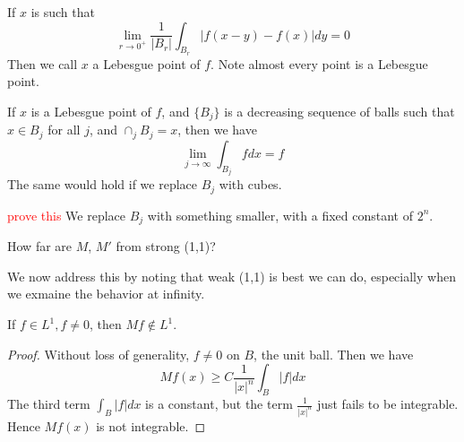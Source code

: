 \begin{definition}
    If $x$ is such that 
    \begin{equation*}
        \lim_{r\to 0^+}\frac{1}{|B_r|}\int_{B_r}|f(x-y)-f(x)|dy=0
    \end{equation*}
    Then we call $x$ a Lebesgue point of $f$. Note almost every point is a Lebesgue point.
\end{definition}
\begin{proposition}
    If $x$ is a Lebesgue point of $f$, and $\{B_j\}$ is a decreasing sequence of balls such that $x\in B_j$ for all $j$, and $\cap_jB_j=x$, then we have
    \begin{equation*}
        \lim_{j\to\infty}\int_{B_j}fdx=f
    \end{equation*}
    The same would hold if we replace $B_j$ with cubes.
\end{proposition}
\begin{remark}
    \textcolor{red}{prove this} We replace $B_j$ with something smaller, with a fixed constant of $2^n$.
\end{remark}

\begin{problem}
    How far are $M$, $M'$ from strong (1,1)?
\end{problem}
We now address this by noting that weak (1,1) is best we can do, especially when we exmaine the behavior at infinity.
\begin{proposition}
    If $f\in L^1, f\neq 0$, then $Mf\not\in L^1$.
\end{proposition}
\begin{proof}
    Without loss of generality, $f\neq 0$ on $B$, the unit ball. Then we have
    \begin{equation*}
        Mf(x)\geq C\frac{1}{|x|^n}\int_{B}|f|dx
    \end{equation*}
    The third term $\int_B|f|dx$ is a constant, but the term $\frac{1}{|x|^n}$ just fails to be integrable. Hence $Mf(x)$ is not integrable.
\end{proof}

